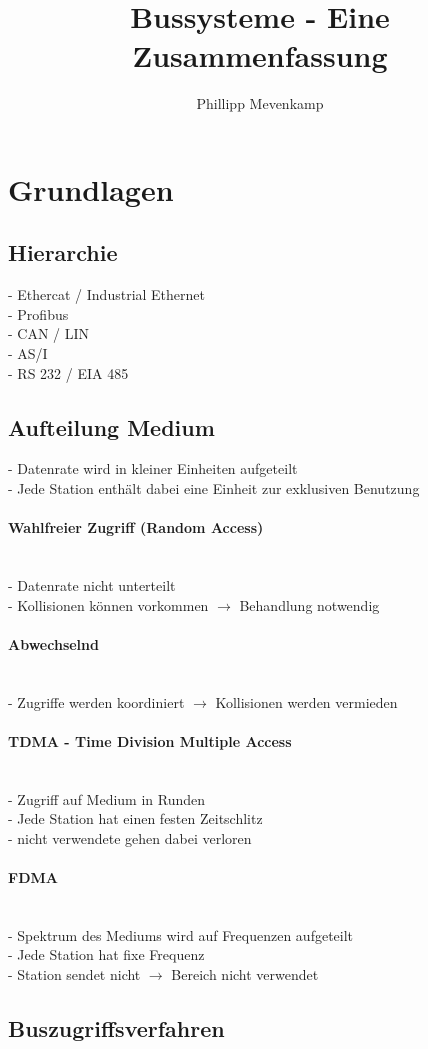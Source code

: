 \documentclass{article}
\newcommand{\myparagraph}[1]{\paragraph{#1}\mbox{}\\}
\newcommand{\follows}{$\rightarrow$ }
\begin{document}
	
	\begin{acronym}
	\end{acronym}
	
	\title{Bussysteme - Eine Zusammenfassung}
	\author{Phillipp Mevenkamp}
	
	\maketitle
	
	\section{Grundlagen}
	\subsection{Hierarchie}
	- Ethercat / Industrial Ethernet \\	
	- Profibus \\	
	- CAN / LIN \\
	- AS/I \\
	- RS 232 / EIA 485
	
	\subsection{Aufteilung Medium}
	- Datenrate wird in kleiner Einheiten aufgeteilt \\
	- Jede Station enthält dabei eine Einheit zur exklusiven Benutzung
	
	\myparagraph{Wahlfreier Zugriff (Random Access)}
	- Datenrate nicht unterteilt \\
	- Kollisionen können vorkommen \follows Behandlung notwendig
	
	\myparagraph{Abwechselnd}
	- Zugriffe werden koordiniert \follows Kollisionen werden vermieden
	
	\myparagraph{TDMA - Time Division Multiple Access}
	- Zugriff auf Medium in Runden \\
	- Jede Station hat einen festen Zeitschlitz \\
	- nicht verwendete gehen dabei verloren
	
	\myparagraph{\ac{FDMA}}
	- Spektrum des Mediums wird auf Frequenzen aufgeteilt \\
	- Jede Station hat fixe Frequenz \\
	- Station sendet nicht \follows Bereich nicht verwendet
	
	\subsection{Buszugriffsverfahren}
	
\end{document}
